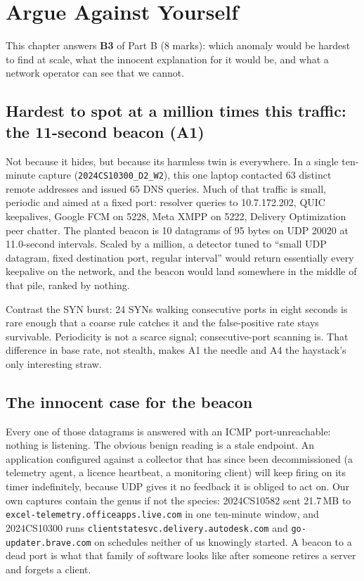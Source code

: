 \chapter{Argue Against Yourself}\label{ch:B3}

This chapter answers \textbf{B3} of Part B (8 marks): which anomaly would be hardest to find at
scale, what the innocent explanation for it would be, and what a network operator can see that we
cannot.

\section{Hardest to spot at a million times this traffic: the 11-second beacon (A1)}

Not because it hides, but because its harmless twin is everywhere. In a single ten-minute
capture (\texttt{2024CS10300\_D2\_W2}), this one laptop contacted 63 distinct remote
addresses and issued 65 DNS queries. Much of that traffic is small, periodic and aimed at a fixed
port: resolver queries to 10.7.172.202, QUIC keepalives, Google FCM on 5228, Meta XMPP on 5222,
Delivery Optimization peer chatter. The planted beacon is 10 datagrams of 95 bytes on UDP 20020
at 11.0-second intervals. Scaled by a million, a detector tuned to ``small UDP datagram, fixed
destination port, regular interval'' would return essentially every keepalive on the network, and
the beacon would land somewhere in the middle of that pile, ranked by nothing.

Contrast the SYN burst: 24 SYNs walking consecutive ports in eight seconds is rare enough that a
coarse rule catches it and the false-positive rate stays survivable. Periodicity is not a scarce
signal; consecutive-port scanning is. That difference in base rate, not stealth, makes A1 the
needle and A4 the haystack's only interesting straw.

\section{The innocent case for the beacon}

Every one of those datagrams is answered with an ICMP port-unreachable: nothing is listening. The
obvious benign reading is a stale endpoint. An application configured against a collector that
has since been decommissioned (a telemetry agent, a licence heartbeat, a monitoring client)
will keep firing on its timer indefinitely, because UDP gives it no feedback it is obliged to act
on. Our own captures contain the genus if not the species: 2024CS10582 sent 21.7\,MB to
\texttt{excel-telemetry.officeapps.live.com} in one ten-minute window, and 2024CS10300 runs
\texttt{clientstatesvc.delivery.autodesk.com} and \texttt{go-updater.brave.com} on schedules
neither of us knowingly started. A beacon to a dead port is what that family of software looks
like after someone retires a server and forgets a client.

